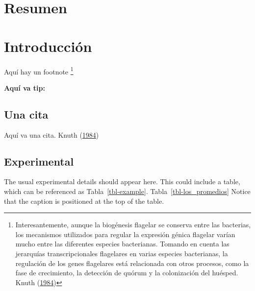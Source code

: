 \documentclass[
  12pt,
  letterpaper,
  DIV=11,
  numbers=noendperiod,
  oneside]{scrreport}
\begin{document}

\hypertarget{resumen}{%
\chapter{Resumen}\label{resumen}}


\hypertarget{sec-Introduccion}{%
\chapter{Introducción}\label{sec-Introduccion}}

Aquí hay un footnote \footnote{Interesantemente, aunque la biogénesis
  flagelar se conserva entre las bacterias, los mecanismos utilizados
  para regular la expresión génica flagelar varían mucho entre las
  diferentes especies bacterianas. Tomando en cuenta las jerarquías
  transcripcionales flagelares en varias especies bacterianas, la
  regulación de los genes flagelares está relacionada con otros
  procesos, como la fase de crecimiento, la detección de quórum y la
  colonización del huésped. Knuth
  (\protect\hyperlink{ref-knuth84}{1984})}

\begin{tcolorbox}[enhanced jigsaw, colframe=quarto-callout-tip-color-frame, left=2mm, opacityback=0, bottomrule=.15mm, breakable, colback=white, arc=.35mm, rightrule=.15mm, leftrule=.75mm, toprule=.15mm]

\textbf{Aquí va tip:}\vspace{2mm}

\end{tcolorbox}

\hypertarget{una-cita}{%
\section{Una cita}\label{una-cita}}

Aquí va una cita. Knuth (\protect\hyperlink{ref-knuth84}{1984})

\hypertarget{experimental}{%
\section{Experimental}\label{experimental}}

The usual experimental details should appear here. This could include a
table, which can be referenced as Tabla~\ref{tbl-example}.
Tabla~\ref{tbl-los_promedios} Notice that the caption is positioned at
the top of the table.
\end{document}
